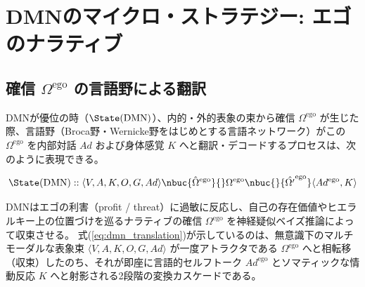 \chapter{DMNのマイクロ・ストラテジー: エゴのナラティブ}
\section{確信 $\Omega^{\mathrm{ego}}$ の言語野による翻訳}

DMNが優位の時（$\State(\mathrm{DMN})$）、内的・外的表象の束から確信 $\Omega^{\mathrm{ego}}$ が生じた際、言語野（Broca野・Wernicke野をはじめとする言語ネットワーク）がこの $\Omega^{\mathrm{ego}}$ を内部対話 $Ad$ および身体感覚 $K$ へと翻訳・デコードするプロセスは、次のように表現できる。

\begin{equation}
    \State(\mathrm{DMN}) :: \langle V, A, K, O, G, Ad \rangle \nbuc{\hat{\Omega}^{\mathrm{ego}}}{} \Omega^{\mathrm{ego}} \nbuc{}{\hat{\Omega'}^{\mathrm{ego}}} \langle Ad^{\mathrm{ego}}, K \rangle
    \label{eq:dmn_translation}
\end{equation}

DMNはエゴの利害（profit / threat）に過敏に反応し、自己の存在価値やヒエラルキー上の位置づけを巡るナラティブの確信 $\Omega^{\mathrm{ego}}$ を神経疑似ベイズ推論によって収束させる。
式(\ref{eq:dmn_translation})が示しているのは、無意識下のマルチモーダルな表象束 $\langle V, A, K, O, G, Ad \rangle$ が一度アトラクタである $\Omega^{\mathrm{ego}}$ へと相転移（収束）したのち、それが即座に言語的セルフトーク $Ad^{\mathrm{ego}}$ とソマティックな情動反応 $K$ へと射影される2段階の変換カスケードである。

